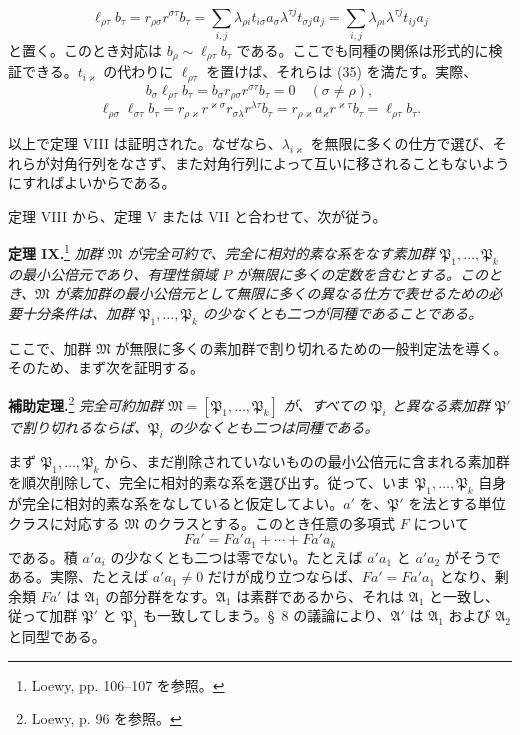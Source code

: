 \[
 \ell_{\rho\tau}b_\tau=r_{\rho\sigma}r^{\sigma\tau}b_\tau
 =\sum_{i,j}\lambda_{\rho i}t_{i\sigma}a_\sigma\lambda^{\tau j}t_{\sigma j}a_j
 =\sum_{i,j}\lambda_{\rho i}\lambda^{\tau j}t_{ij}a_j
\]
と置く。このとき対応は $b_\rho\sim\ell_{\rho\tau}b_\tau$ である。ここでも同種の関係は形式的に検証できる。$t_{i\varkappa}$ の代わりに $\ell_{\rho\tau}$ を置けば、それらは (35) を満たす。実際、
\[
 b_\sigma\ell_{\rho\tau}b_\tau=b_\sigma r_{\rho\sigma}r^{\sigma\tau}b_\tau=0\quad(\sigma\ne\rho),
\]
\[
 \ell_{\rho\sigma}\ell_{\sigma\tau}b_\tau=r_{\rho\varkappa}r^{\varkappa\sigma}r_{\sigma\lambda}r^{\lambda\tau}b_\tau
 =r_{\rho\varkappa}a_\varkappa r^{\varkappa\tau}b_\tau=\ell_{\rho\tau}b_\tau.
\]

以上で定理 VIII は証明された。なぜなら、$\lambda_{i\varkappa}$ を無限に多くの仕方で選び、それらが対角行列をなさず、また対角行列によって互いに移されることもないようにすればよいからである。

定理 VIII から、定理 V または VII と合わせて、次が従う。

\textbf{定理 IX.}\footnote{Loewy, pp. 106--107 を参照。} \emph{加群 $\mathfrak M$ が完全可約で、完全に相対的素な系をなす素加群 $\mathfrak P_1,\ldots,\mathfrak P_k$ の最小公倍元であり、有理性領域 $P$ が無限に多くの定数を含むとする。このとき、$\mathfrak M$ が素加群の最小公倍元として無限に多くの異なる仕方で表せるための必要十分条件は、加群 $\mathfrak P_1,\ldots,\mathfrak P_k$ の少なくとも二つが同種であることである。}

ここで、加群 $\mathfrak M$ が無限に多くの素加群で割り切れるための一般判定法を導く。そのため、まず次を証明する。

\textbf{補助定理.}\footnote{Loewy, p. 96 を参照。} \emph{完全可約加群 $\mathfrak M=[\mathfrak P_1,\ldots,\mathfrak P_k]$ が、すべての $\mathfrak P_i$ と異なる素加群 $\mathfrak P'$ で割り切れるならば、$\mathfrak P_i$ の少なくとも二つは同種である。}

まず $\mathfrak P_1,\ldots,\mathfrak P_k$ から、まだ削除されていないものの最小公倍元に含まれる素加群を順次削除して、完全に相対的素な系を選び出す。従って、いま $\mathfrak P_1,\ldots,\mathfrak P_k$ 自身が完全に相対的素な系をなしていると仮定してよい。$a'$ を、$\mathfrak P'$ を法とする単位クラスに対応する $\mathfrak M$ のクラスとする。このとき任意の多項式 $F$ について
\[
 Fa'=Fa'a_1+
\cdots+Fa'a_k
\]
である。積 $a'a_i$ の少なくとも二つは零でない。たとえば $a'a_1$ と $a'a_2$ がそうである。実際、たとえば $a'a_1\ne0$ だけが成り立つならば、$Fa'=Fa'a_1$ となり、剰余類 $Fa'$ は $\mathfrak A_1$ の部分群をなす。$\mathfrak A_1$ は素群であるから、それは $\mathfrak A_1$ と一致し、従って加群 $\mathfrak P'$ と $\mathfrak P_1$ も一致してしまう。\S~8 の議論により、$\mathfrak A'$ は $\mathfrak A_1$ および $\mathfrak A_2$ と同型である。

